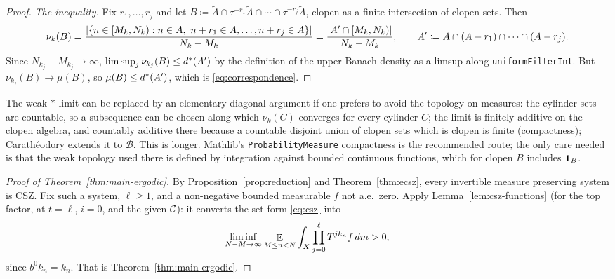 \begin{proof}
  \emph{The inequality.}  Fix $r_1,\dots,r_j$ and let
  $B \coloneqq \widetilde A \cap \tau^{-r_1}\widetilde A \cap\cdots\cap\tau^{-r_j}\widetilde A$, clopen as
  a finite intersection of clopen sets.  Then
  \[
    \nu_k(B) = \frac{\lvert \{n \in [M_k,N_k) : n \in A,\ n + r_1 \in A, \dots, n + r_j \in A\} \rvert}{N_k - M_k}
      = \frac{\lvert A' \cap [M_k,N_k) \rvert}{N_k - M_k} , \qquad A' \coloneqq A \cap (A - r_1) \cap \cdots \cap (A - r_j) .
  \]
  Since $N_{k_j} - M_{k_j} \to \infty$, $\limsup_j \nu_{k_j}(B) \leq d^{\ast}(A')$ by the definition
  of the upper Banach density as a limsup along \texttt{uniformFilterInt}.  But
  $\nu_{k_j}(B) \to \mu(B)$, so $\mu(B) \leq d^{\ast}(A')$, which is \eqref{eq:correspondence}.
\end{proof}

\begin{remark}
  The weak-$\ast$ limit can be replaced by an elementary diagonal argument if one prefers to
  avoid the topology on measures: the cylinder sets are countable, so a subsequence can be
  chosen along which $\nu_k(C)$ converges for every cylinder $C$; the limit is finitely
  additive on the clopen algebra, and countably additive there because a countable disjoint
  union of clopen sets which is clopen is finite (compactness); Carath\'eodory extends it to
  $\mathcal B$.  This is longer.  Mathlib's \texttt{ProbabilityMeasure} compactness is the
  recommended route; the only care needed is that the weak topology used there is defined by
  integration against bounded continuous functions, which for clopen $B$ includes $\mathbf{1}_B$.
\end{remark}

\begin{proof}[Proof of Theorem~\ref{thm:main-ergodic}]
  By Proposition~\ref{prop:reduction} and Theorem~\ref{thm:ecsz}, every invertible measure
  preserving system is CSZ.  Fix such a system, $\ell \geq 1$, and a non-negative bounded
  measurable $f$ not a.e.\ zero.  Apply Lemma~\ref{lem:csz-functions} (for the top factor, at
  $t = \ell$, $i = 0$, and the given $\mathcal{C}$): it converts the set form \eqref{eq:csz} into
  \[
    \liminf_{N-M \to \infty}\mathop{\mathbb{E}}_{M \leq n < N} \int_X \prod_{j=0}^{\ell} T^{jk_n}f\,dm > 0 ,
  \]
  since $b^0k_n = k_n$.  That is Theorem~\ref{thm:main-ergodic}.
\end{proof}
